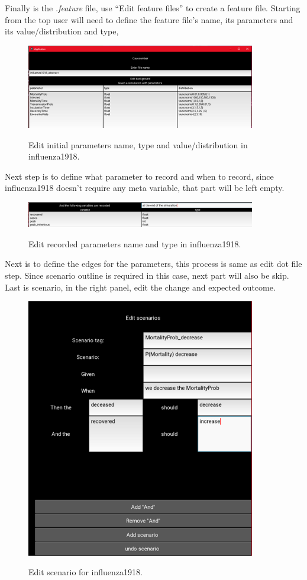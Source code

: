 Finally is the \textsl{.feature} file, use “Edit feature files” to create a feature file. Starting from the top user will need to define the feature file’s name, its parameters and its value/distribution and type,
\begin{figure}[H]
	\centering
	\includegraphics[width=10cm]{figures/influenzaTestProcess10.png}\\
	\caption{Edit initial parameters name, type and value/distribution in influenza1918.}
	\label{fig:figure28}
\end{figure}
Next step is to define what parameter to record and when to record, since influenza1918 doesn’t require any meta variable, that part will be left empty.
\begin{figure}[H]
	\centering
	\includegraphics[width=10cm]{figures/influenzaTestProcess11.png}\\
	\caption{Edit recorded parameters name and type in influenza1918.}
	\label{fig:figure29}
\end{figure}
Next is to define the edges for the parameters, this process is same as edit dot file step. Since scenario outline is required in this case, next part will also be skip. Last is scenario, in the right panel, edit the change and expected outcome. 
\begin{figure}[H]
	\centering
	\includegraphics[width=10cm]{figures/influenzaTestProcess12.png}\\
	\caption{Edit scenario for influenza1918.}
	\label{fig:figure30}
\end{figure}
